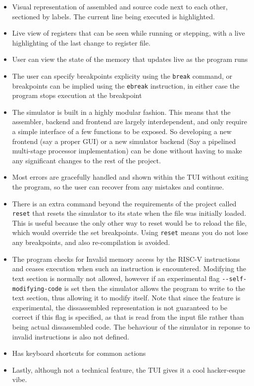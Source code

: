 \documentclass[12pt]{article}
\begin{document}
	\begin{itemize}
		\item Visual representation of assembled and source code next to each other, sectioned by labels. The current line being executed is highlighted.

		\item Live view of registers that can be seen while running or stepping, with a live highlighting of the last change to register file.
		
		\item User can view the state of the memory that updates live as the program runs
		
		\item The user can specify breakpoints explicity using the \verb|break| command, or breakpoints can be implied using the \verb|ebreak| instruction, in either case the program stops execution at the breakpoint
		
		\item The simulator is built in a highly modular fashion. This means that the assembler, backend and frontend are largely interdependent, and only require a simple interface of a few functions to be exposed. So developing a new frontend (say a proper GUI) or a new simulator backend (Say a pipelined multi-stage processor implementation) can be done without having to make any significant changes to the rest of the project.
		
		\item Most errors are gracefully handled and shown within the TUI without exiting the program, so the user can recover from any mistakes and continue.
		
		\item There is an extra command beyond the requirements of the project called \verb|reset| that resets the simulator to its state when the file was initially loaded. This is useful because the only other way to reset would be to reload the file, which would override the set breakpoints. Using \verb|reset| means you do not lose any breakpoints, and also re-compilation is avoided.
		
		\item The program checks for Invalid memory access by the RISC-V instructions and ceases execution when such an instruction is encountered. Modifying the text section is normally not allowed, however if an experimental flag \verb|--self-modifying-code| is set then the simulator allows the program to write to the text section, thus allowing it to modify itself. Note that since the feature is experimental, the dissassembled representation is not guaranteed to be correct if this flag is specified, as that is read from the input file rather than being actual dissassembled code. The behaviour of the simulator in reponse to invalid instructions is also not defined.
		
		\item Has keyboard shortcuts for common actions

		\item Lastly, although not a technical feature, the TUI gives it a cool hacker-esque vibe.
	\end{itemize}
	
\end{document}
